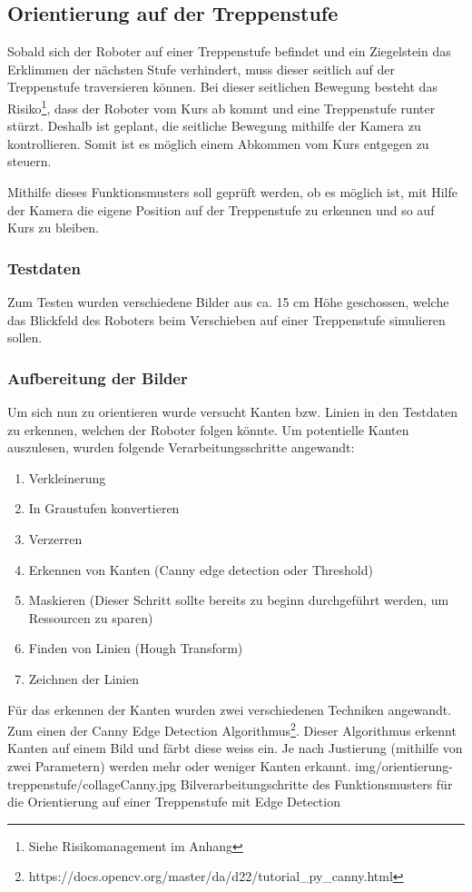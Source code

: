 \subsection{Orientierung auf der Treppenstufe}
\label{orientierungAufTreppenstufe}
Sobald sich der Roboter auf einer Treppenstufe befindet und ein Ziegelstein das Erklimmen der nächsten Stufe verhindert, muss dieser seitlich auf der Treppenstufe traversieren können. Bei dieser seitlichen Bewegung besteht das Risiko\footnote{Siehe Risikomanagement im Anhang}, dass der Roboter vom Kurs ab kommt und eine Treppenstufe runter stürzt.
Deshalb ist geplant, die seitliche Bewegung mithilfe der Kamera zu kontrollieren. Somit ist es möglich einem Abkommen vom Kurs entgegen zu steuern.

Mithilfe dieses Funktionsmusters soll geprüft werden, ob es möglich ist, mit Hilfe der Kamera die eigene Position auf der Treppenstufe zu erkennen und so auf Kurs zu bleiben. 

\subsubsection{Testdaten}
Zum Testen wurden verschiedene Bilder aus ca. 15 cm Höhe geschossen, welche das Blickfeld des Roboters beim Verschieben auf einer Treppenstufe simulieren sollen.

\subsubsection{Aufbereitung der Bilder}
\label{aufbereitungDerBilder}
Um sich nun zu orientieren wurde versucht Kanten bzw. Linien in den Testdaten zu erkennen, welchen der Roboter folgen könnte. Um potentielle Kanten auszulesen, wurden folgende Verarbeitungsschritte angewandt:
\begin{enumerate}
    \item Verkleinerung
    \item In Graustufen konvertieren
    \item Verzerren
    \item Erkennen von Kanten (Canny edge detection oder Threshold)
    \item Maskieren (Dieser Schritt sollte bereits zu beginn durchgeführt werden, um Ressourcen zu sparen)
    \item Finden von Linien (Hough Transform)
    \item Zeichnen der Linien
\end{enumerate}
Für das erkennen der Kanten wurden zwei verschiedenen Techniken angewandt. Zum einen der Canny Edge Detection Algorithmus\footnote{https://docs.opencv.org/master/da/d22/tutorial\_py\_canny.html}. Dieser Algorithmus erkennt Kanten auf einem Bild und färbt diese weiss ein. Je nach Justierung (mithilfe von zwei Parametern) werden mehr oder weniger Kanten erkannt.
\image
  {img/orientierung-treppenstufe/collageCanny.jpg}
  {Bilverarbeitungschritte des Funktionsmusters für die Orientierung auf einer Treppenstufe mit Edge Detection}
  
